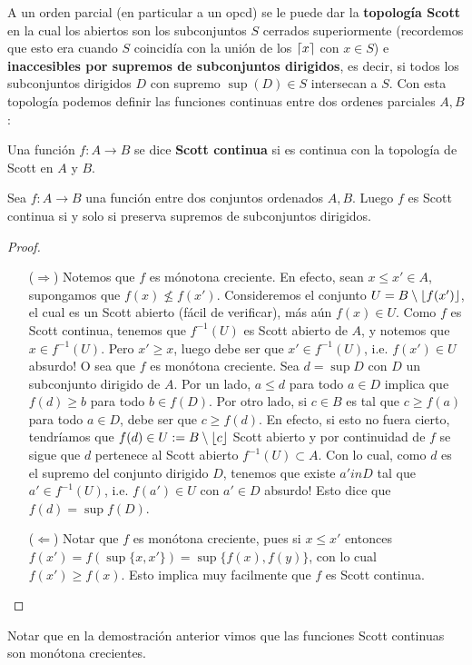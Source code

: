 \documentclass[../main.tex]{subfiles}
\begin{document}
A un orden parcial (en particular a un opcd) se le puede dar la \textbf{topología Scott} en la cual los abiertos son los subconjuntos $S$ cerrados
superiormente (recordemos que
esto era cuando $S$ coincidía con
 la unión de los $\left\lceil x \right\rceil$ con $x \in S$) e \textbf{inaccesibles por supremos de subconjuntos dirigidos}, es
  decir, si todos los subconjuntos dirigidos $D$ con supremo $\sup (D) \in S$ intersecan a $S$. Con esta
  topología podemos definir las funciones continuas entre dos ordenes parciales $A,B$:

  \begin{definition}
  Una función $f : A \rightarrow B$ se dice \textbf{Scott continua} si es continua con la topología de Scott
  en $A$ y $B$.
  \end{definition}

  \begin{lemma}
  Sea $f: A \rightarrow B$ una función entre dos conjuntos ordenados $A,B$. Luego $f$ es Scott continua si y
  solo si
  preserva
  supremos de subconjuntos dirigidos.
  \end{lemma}
  \begin{proof}
  \begin{enumerate}[(i)]
  \item[($\Rightarrow$)] Notemos que $f$ es mónotona creciente. En efecto, sean $x \leq x' \in A$, supongamos
  que $f(x) \not \leq f(x')$. Consideremos el conjunto $U = B \setminus \left\lfloor f(x') \right\rfloor$, el cual es un Scott
  abierto (fácil de verificar), más aún $f(x) \in U$. Como $f$ es Scott continua, tenemos que $f^{-1} (U)$ es
   Scott abierto de $A$, y notemos que $x \in f^{-1} (U)$. Pero $x' \geq x$, luego debe ser que $x' \in f^{-1} (U)$, i.e. $f(x') \in U$ absurdo! O sea que $f$ es monótona creciente. Sea $d = \sup D$ con $D$ un subconjunto dirigido de $A$. Por un lado, $a \leq d $ para todo $a \in D$ implica que $f(d) \geq b$ para todo $b \in f(D)$. Por otro lado, si $c \in B$ es tal que $c \geq f(a)$ para todo $a \in D$, debe ser que $c \geq f(d)$. En efecto, si esto no fuera cierto, tendríamos que $f(d) \in U := B \setminus \left\lfloor c \right\rfloor$ Scott abierto y por continuidad de $f$ se sigue que $d$ pertenece al Scott abierto $f^{-1} (U) \subset A$. Con lo cual, como $d$ es el supremo del conjunto dirigido $D$, tenemos que existe $a' in D$ tal que $a' \in f^{-1} (U)$, i.e. $f(a') \in U$ con $a' \in D$ absurdo! Esto dice que $f(d) = \sup f(D)$.
  \item[($\Leftarrow$)] Notar que $f$ es monótona creciente, pues si $x \leq x'$ entonces $f(x') = f(\sup \{ x,
  x'\}) = \sup \{f(x),f(y)\}$, con lo cual $f(x') \geq f(x)$. Esto implica muy facilmente que $f$ es Scott continua.
  \end{enumerate}
  \end{proof}
  Notar que en la demostración anterior vimos que las funciones Scott continuas son monótona crecientes.
\end{document}
